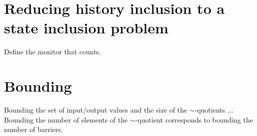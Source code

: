 

\section{Reducing history inclusion to a state inclusion problem}

Define the monitor that counts.
 
\section{Bounding}

Bounding the set of input/output values and the size of the $\sim$-quotients ... Bounding the number of elements of the $\sim$-quotient corresponds to bounding the number of barriers.

